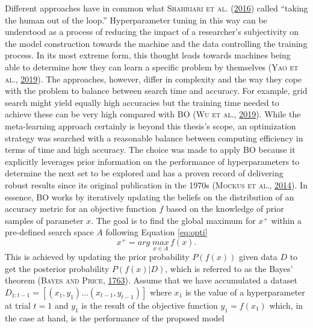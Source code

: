 \documentclass[a4paper,11pt]{article}
\begin{document}
Different approaches have in common what \textsc{\textnormal{Shahriari} \textnormal{et al.}} \textsc{(\textnormal{\protect\hyperlink{ref-shahriari2016}{2016}})} called ``taking the human out of the loop.''
Hyperparameter tuning in this way can be understood as a process of reducing the
impact of a researcher's subjectivity on the model construction towards the
machine and the data controlling the training process.
In its most extreme form, this thought leads towards machines being able to
determine how they can learn a specific problem by themselves \textsc{(\textnormal{\textsc{Yao} \textsc{et al.}}, \textnormal{\protect\hyperlink{ref-yao2019a}{2019}})}.
The approaches, however, differ in complexity and the way they cope with the
problem to balance between search time and accuracy. For example, grid search
might yield equally high accuracies but the training time needed to achieve these
can be very high compared with BO \textsc{(\textnormal{\textsc{Wu} \textsc{et al.}}, \textnormal{\protect\hyperlink{ref-wu2019}{2019}})}.
While the meta-learning approach certainly is beyond this thesis's scope, an
optimization strategy was searched with a reasonable balance between computing
efficiency in terms of time and high accuracy. The choice was made to apply
BO because it explicitly leverages prior information on the performance of
hyperparameters to determine the next set to be explored and has a proven
record of delivering robust results since its original publication in the 1970s
\textsc{(\textnormal{\textsc{Mockus} \textsc{et al.}}, \textnormal{\protect\hyperlink{ref-mockus2014}{2014}})}. In essence, BO works by iteratively updating the beliefs on
the distribution of an accuracy metric for an objective function \(f\) based on the
knowledge of prior samples of parameter \(x\). The goal is to find the global maximum
for \(x^+\) within a pre-defined search space \(A\) following Equation \eqref{eq:opti}
\begin{equation}
x^+ = arg\;\underset{x \in A}{max} \, f(x).
\label{eq:opti}
\end{equation}
This is achieved by updating the prior probability \(P(f(x))\) given data \(D\) to
get the posterior probability \(P(f(x)|D)\), which is referred to as the Bayes'
theorem \textsc{(\textnormal{\textsc{Bayes} and \textsc{Price}}, \textnormal{\protect\hyperlink{ref-bayes1763}{1763}})}. Assume that we have accumulated a dataset
\(D_{1:t-1} = [(x_1,y_1) \dots (x_{t-1},y_{t-1})]\) where \(x_1\) is the value of a
hyperparameter at trial \(t = 1\) and \(y_1\) is the result of the objective function
\(y_1 = f(x_1)\) which, in the case at hand, is the performance of the proposed model
\end{document}
